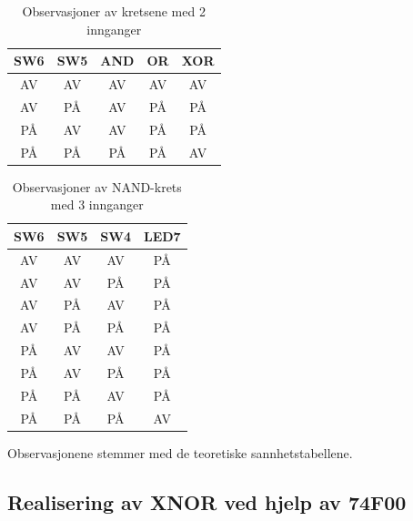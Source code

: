 \documentclass[11pt,a4paper,twocolumn]{article}
\begin{document}
\begin{table}[h]
	\centering %
	\setlength{\belowcaptionskip}{6pt} %
	\setlength{\tabcolsep}{3pt} %

	\caption{Observasjoner av kretsene med 2 innganger}
	\label{tab:2-input-results}

	\noindent
	\begin{tabular}{c|c|c|c|c}
		\hline
		SW6 & SW5 & AND & OR & XOR \\
		\hline
		AV & AV & AV & AV & AV \\
		AV & PÅ & AV & PÅ & PÅ \\
		PÅ & AV & AV & PÅ & PÅ \\
		PÅ & PÅ & PÅ & PÅ & AV \\
		\hline
	\end{tabular}
\end{table}

\begin{table}[h]
	\centering %
	\setlength{\belowcaptionskip}{6pt} %
	\setlength{\tabcolsep}{3pt} %

	\caption{Observasjoner av NAND-krets med 3 innganger}
	\label{tab:3-input-nand-results}

	\noindent
	\begin{tabular}{c|c|c|c}
		\hline
		SW6 & SW5 & SW4 & LED7 \\
		\hline
		AV & AV & AV & PÅ \\
		AV & AV & PÅ & PÅ \\
		AV & PÅ & AV & PÅ \\
		AV & PÅ & PÅ & PÅ \\
		PÅ & AV & AV & PÅ \\
		PÅ & AV & PÅ & PÅ \\
		PÅ & PÅ & AV & PÅ \\
		PÅ & PÅ & PÅ & AV \\
		\hline
	\end{tabular}
\end{table}

Observasjonene stemmer med de teoretiske sannhetstabellene.

\subsection{Realisering av XNOR ved hjelp av 74F00}
\end{document}
